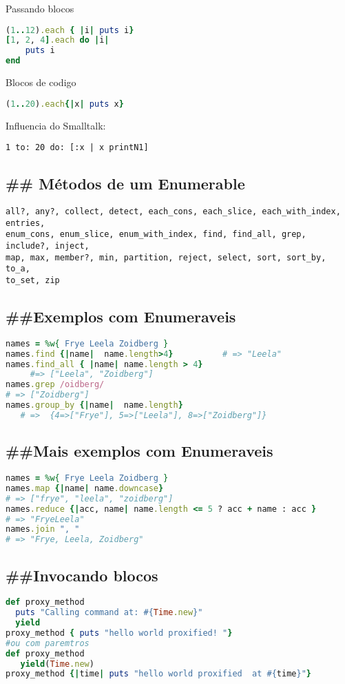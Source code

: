 \documentclass[serif,mathserif]{article}
\begin{document}
Passando blocos
\begin{lstlisting}[language=ruby]
(1..12).each { |i| puts i}
[1, 2, 4].each do |i|
    puts i
end
\end{lstlisting}

Blocos de codigo
\begin{lstlisting}[language=ruby]
(1..20).each{|x| puts x}
\end{lstlisting}

Influencia do Smalltalk:
\begin{lstlisting}[language=smalltalk]
   1 to: 20 do: [:x | x printN1]
\end{lstlisting}

\subsection{\#\# Métodos de um Enumerable}
\begin{lstlisting}  
all?, any?, collect, detect, each_cons, each_slice, each_with_index, entries,
enum_cons, enum_slice, enum_with_index, find, find_all, grep, include?, inject,
map, max, member?, min, partition, reject, select, sort, sort_by, to_a,
to_set, zip
\end{lstlisting}
 
\subsection{\#\#Exemplos com Enumeraveis}
\begin{lstlisting}[language=ruby]
names = %w{ Frye Leela Zoidberg }
names.find {|name|  name.length>4}          # => "Leela"
names.find_all { |name| name.length > 4}
     #=> ["Leela", "Zoidberg"]
names.grep /oidberg/
# => ["Zoidberg"]
names.group_by {|name|  name.length}
   # =>  {4=>["Frye"], 5=>["Leela"], 8=>["Zoidberg"]}
\end{lstlisting}

\subsection{\#\#Mais exemplos com Enumeraveis}
\begin{lstlisting}[language=ruby]
names = %w{ Frye Leela Zoidberg }
names.map {|name| name.downcase}
# => ["frye", "leela", "zoidberg"]
names.reduce {|acc, name| name.length <= 5 ? acc + name : acc }
# => "FryeLeela"
names.join ", "
# => "Frye, Leela, Zoidberg"
\end{lstlisting}


\subsection{\#\#Invocando blocos}
\begin{lstlisting}[language=ruby]
def proxy_method
  puts "Calling command at: #{Time.new}"
  yield
proxy_method { puts "hello world proxified! "}
#ou com paremtros
def proxy_method
   yield(Time.new)
proxy_method {|time| puts "hello world proxified  at #{time}"}
\end{lstlisting}
\end{document}
